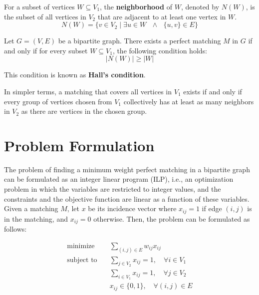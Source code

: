 \begin{definition}[Neighborhood] \label{def:neighborhood}
For a subset of vertices $W \subseteq V_1$, the \textbf{neighborhood} of $W$, denoted by $N(W)$, is the subset of all vertices in $V_2$ that are adjacent to at least one vertex in $W$.
\[ N(W) = \{ v \in V_2 \mid \exists u \in W \text{ $\land$ } \{u, v\} \in E \} \]
\end{definition}

\begin{theorem} \label{thm:halls_marriage_theorem}
    Let $G = (V, E)$ be a bipartite graph. There exists a perfect matching $M$ in $G$ if and only if for every subset $W \subseteq V_1$, the following condition holds:
    $$|N(W)| \geq |W|$$
\end{theorem}

This condition is known as \textbf{Hall's condition}.

In simpler terms, a matching that covers all vertices in $V_1$ exists if and only if every group of vertices chosen from $V_1$ collectively has at least as many neighbors in $V_2$ as there are vertices in the chosen group.

\section{Problem Formulation}
The problem of finding a minimum weight perfect matching in a bipartite graph can be formulated as an integer linear program (ILP), i.e., an optimization problem in which the variables are restricted to integer values, and the constraints and the objective function are linear as a function of these variables. Given a matching $M$, let $x$ be its incidence vector where $x_{ij} = 1$ if edge $(i, j)$ is in the matching, and $x_{ij} = 0$ otherwise. Then, the problem can be formulated as follows:

\begin{equation}
    \begin{aligned}
        \text{minimize} \quad & \sum_{(i, j) \in E} w_{ij} x_{ij} \\
        \text{subject to} \quad & \sum_{j \in V_2} x_{ij} = 1, \quad \forall i \in V_1 \\
        & \sum_{i \in V_1} x_{ij} = 1, \quad \forall j \in V_2 \\
        & x_{ij} \in \{0, 1\}, \quad \forall (i, j) \in E
    \end{aligned}
\end{equation}

